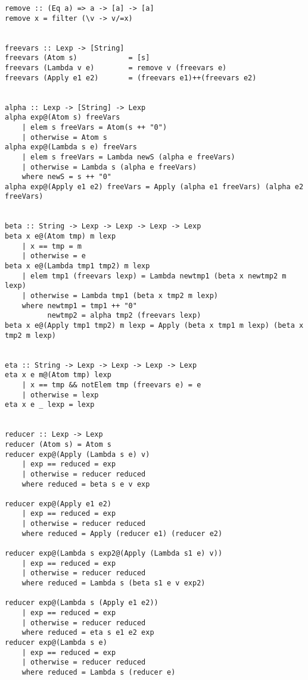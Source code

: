\documentclass{article}
\begin{document}
    \begin{verbatim}
remove :: (Eq a) => a -> [a] -> [a]
remove x = filter (\v -> v/=x)


freevars :: Lexp -> [String]
freevars (Atom s)            = [s]
freevars (Lambda v e)        = remove v (freevars e)
freevars (Apply e1 e2)       = (freevars e1)++(freevars e2)


alpha :: Lexp -> [String] -> Lexp
alpha exp@(Atom s) freeVars
    | elem s freeVars = Atom(s ++ "0")
    | otherwise = Atom s
alpha exp@(Lambda s e) freeVars
    | elem s freeVars = Lambda newS (alpha e freeVars)
    | otherwise = Lambda s (alpha e freeVars)
    where newS = s ++ "0"
alpha exp@(Apply e1 e2) freeVars = Apply (alpha e1 freeVars) (alpha e2 freeVars)


beta :: String -> Lexp -> Lexp -> Lexp -> Lexp
beta x e@(Atom tmp) m lexp
    | x == tmp = m
    | otherwise = e
beta x e@(Lambda tmp1 tmp2) m lexp
    | elem tmp1 (freevars lexp) = Lambda newtmp1 (beta x newtmp2 m lexp)
    | otherwise = Lambda tmp1 (beta x tmp2 m lexp)
    where newtmp1 = tmp1 ++ "0" 
          newtmp2 = alpha tmp2 (freevars lexp)
beta x e@(Apply tmp1 tmp2) m lexp = Apply (beta x tmp1 m lexp) (beta x tmp2 m lexp)


eta :: String -> Lexp -> Lexp -> Lexp -> Lexp
eta x e m@(Atom tmp) lexp
    | x == tmp && notElem tmp (freevars e) = e
    | otherwise = lexp
eta x e _ lexp = lexp


reducer :: Lexp -> Lexp
reducer (Atom s) = Atom s
reducer exp@(Apply (Lambda s e) v)
    | exp == reduced = exp
    | otherwise = reducer reduced
    where reduced = beta s e v exp

reducer exp@(Apply e1 e2) 
    | exp == reduced = exp
    | otherwise = reducer reduced
    where reduced = Apply (reducer e1) (reducer e2)

reducer exp@(Lambda s exp2@(Apply (Lambda s1 e) v)) 
    | exp == reduced = exp
    | otherwise = reducer reduced
    where reduced = Lambda s (beta s1 e v exp2)

reducer exp@(Lambda s (Apply e1 e2))
    | exp == reduced = exp
    | otherwise = reducer reduced
    where reduced = eta s e1 e2 exp
reducer exp@(Lambda s e)
    | exp == reduced = exp
    | otherwise = reducer reduced
    where reduced = Lambda s (reducer e)
    \end{verbatim}
\end{document}
